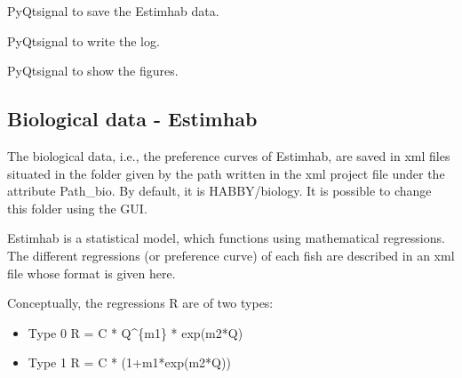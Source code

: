 \documentclass[letterpaper,10pt,english]{sphinxmanual}
\begin{document}
\begin{fulllineitems}

\begin{fulllineitems}
\label{\detokenize{index:src_GUI.estimhab_GUI.EstimhabW.save_signal_estimhab}}
PyQtsignal to save the Estimhab data.

\end{fulllineitems}


\begin{fulllineitems}
\label{\detokenize{index:src_GUI.estimhab_GUI.EstimhabW.send_log}}
PyQtsignal to write the log.

\end{fulllineitems}


\begin{fulllineitems}
\label{\detokenize{index:src_GUI.estimhab_GUI.EstimhabW.show_fig}}
PyQtsignal to show the figures.

\end{fulllineitems}


\end{fulllineitems}



\subsection{Biological data - Estimhab}
\label{\detokenize{index:biological-data-estimhab}}
The biological data, i.e., the preference curves of Estimhab, are saved in xml files
situated in the folder given by the path written in the xml project file under the
attribute Path\_bio. By default, it is HABBY/biology. It is possible to change this folder
using the GUI.

Estimhab is a statistical model, which functions using mathematical regressions.
The different regressions (or preference curve) of each fish are described in an xml file
whose format is given here.

Conceptually, the regressions R are of two types:
\begin{itemize}
\item {} 
Type 0          R = C * Q\textasciicircum{}\{m1\} * exp(m2*Q)

\item {} 
Type 1          R = C * (1+m1*exp(m2*Q))

\end{itemize}
\end{document}
